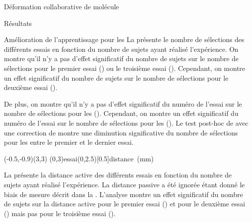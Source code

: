 \documentclass[myfrancais]{mythesis}
\begin{document}
\begin{mychapter}{Déformation collaborative de molécule}
\begin{mysection}{Résultats}
\begin{mysubsection}{Amélioration de l'apprentissage pour les }
				La  présente le nombre de sélections  des différents essais  en fonction du nombre de sujets  ayant réalisé l'expérience.
				On montre qu'il n'y a pas d'effet significatif du nombre de sujets  sur le nombre de sélections  pour le premier essai () ou le troisième essai ().
				Cependant, on montre un effet significatif du nombre de sujets  sur le nombre de sélections  pour le deuxième essai ().

				De plus, on montre qu'il n'y a pas d'effet significatif du numéro de l'essai  sur le nombre de sélections  pour les  ().
				Cependant, on montre un effet significatif du numéro de l'essai  sur le nombre de sélections  pour les  ().
				Le test post-hoc de  avec une correction de  montre une diminution significative du nombre de sélections pour les  entre le premier et le dernier essai.

				\begin{myfigure}
					\begin{myps}(-0.5,-0.9)(3,3)
						\myaxes(0,3){essai}(0,2.5)[0.5]{distance~(mm)}
					\end{myps}
				\end{myfigure}

				La  présente la distance active  des différents essais  en fonction du nombre de sujets  ayant réalisé l'expérience.
				La distance passive a été ignorée étant donné le biais de mesure décrit dans la .
				L'analyse montre un effet significatif du nombre de sujets  sur la distance active  pour le premier essai () et pour le deuxième essai () mais pas pour le troisième essai ().


\end{mysubsection}
\end{mysection}
\end{mychapter}
\end{document}
